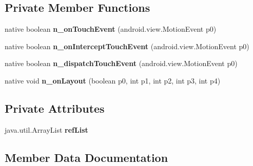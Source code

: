 \subsection*{Private Member Functions}
\begin{DoxyCompactItemize}
\item 
\mbox{\label{classmd5b60ffeb829f638581ab2bb9b1a7f4f3f_1_1VisualElementRenderer__1_abf46ffd446313b87383a085a60d65dd4}} 
native boolean {\bfseries n\+\_\+on\+Touch\+Event} (android.\+view.\+Motion\+Event p0)
\item 
\mbox{\label{classmd5b60ffeb829f638581ab2bb9b1a7f4f3f_1_1VisualElementRenderer__1_aa5005d8febce3d07df2d375121e1b6ca}} 
native boolean {\bfseries n\+\_\+on\+Intercept\+Touch\+Event} (android.\+view.\+Motion\+Event p0)
\item 
\mbox{\label{classmd5b60ffeb829f638581ab2bb9b1a7f4f3f_1_1VisualElementRenderer__1_aecca707bf9b175721aeea8b3018d9c9a}} 
native boolean {\bfseries n\+\_\+dispatch\+Touch\+Event} (android.\+view.\+Motion\+Event p0)
\item 
\mbox{\label{classmd5b60ffeb829f638581ab2bb9b1a7f4f3f_1_1VisualElementRenderer__1_a93658aeaafe1fbcb5301e4b9cbf9f833}} 
native void {\bfseries n\+\_\+on\+Layout} (boolean p0, int p1, int p2, int p3, int p4)
\end{DoxyCompactItemize}
\subsection*{Private Attributes}
\begin{DoxyCompactItemize}
\item 
\mbox{\label{classmd5b60ffeb829f638581ab2bb9b1a7f4f3f_1_1VisualElementRenderer__1_a4ebd0e42ebd360712eb189930036fc9f}} 
java.\+util.\+Array\+List {\bfseries ref\+List}
\end{DoxyCompactItemize}


\subsection{Member Data Documentation}
\mbox{\label{classmd5b60ffeb829f638581ab2bb9b1a7f4f3f_1_1VisualElementRenderer__1_a4ef182bc984a4330ed789e1f0b0222d1}} 
